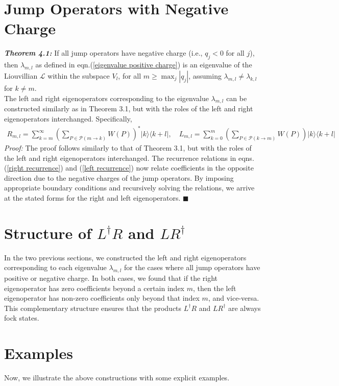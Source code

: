 \documentclass[11pt,a4paper]{article}
\begin{document}
\section{Jump Operators with Negative Charge}
\textit{\textbf{Theorem 4.1: }} If all jump operators have negative charge (i.e., $q_j < 0$ for all $j$), then $\lambda_{m,l}$ as defined in eqn.(\ref{eigenvalue positive charge}) is an eigenvalue of the Liouvillian $\mathcal{L}$ within the subspace $V_l$, for all 
$m \geq \max_{j} |q_j| $, assuming $\lambda_{m,l} \neq \lambda_{k,l}$ for $k \neq m$. \\
The left and right eigenoperators corresponding to the eigenvalue $\lambda_{m,l}$ can be constructed similarly as in Theorem 3.1, but with the roles of the left and right eigenoperators interchanged. Specifically, 
\begin{align}
    R_{m,l} = \sum_{k=m}^{\infty} \left( \sum_{P \in \mathcal{P}(m \to k)} W(P) \right)^* |k\rangle \langle k+l|, \quad L_{m,l} = \sum_{k=0}^{m} \left( \sum_{P \in \mathcal{P}(k \to m)} W(P) \right) |k\rangle \langle k+l|
\end{align}
\textit{Proof: } The proof follows similarly to that of Theorem 3.1, but with the roles of the left and right eigenoperators interchanged. The recurrence relations in eqns.(\ref{right recurrence}) and (\ref{left recurrence}) now relate coefficients in the opposite direction due to the negative charges of the jump operators. By imposing appropriate boundary conditions and recursively solving the relations, we arrive at the stated forms for the right and left eigenoperators. \hspace{4 mm} $\blacksquare$ \\

\section{Structure of $L^{\dagger}R$ and $L R^{\dagger}$}
In the two previous sections, we constructed the left and right eigenoperators corresponding to each eigenvalue $\lambda_{m,l}$ for the cases where all jump operators have positive or negative charge. 
In both cases, we found that if the right eigenoperator has zero coefficients beyond a certain index $m$, then the left eigenoperator has non-zero coefficients only beyond that index $m$, and vice-versa.
This complementary structure ensures that the products $L^{\dagger} R$ and $L R^{\dagger}$ are always fock states.

\section{Examples}
Now, we illustrate the above constructions with some explicit examples.
\end{document}
